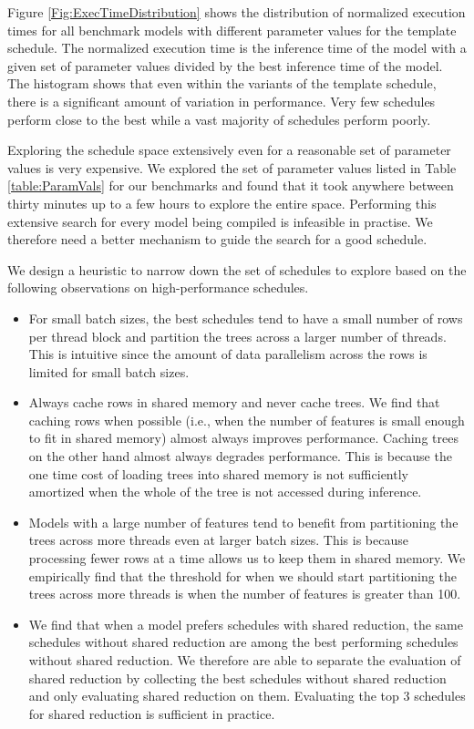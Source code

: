Figure \ref{Fig:ExecTimeDistribution} shows the distribution of normalized execution times
for all benchmark models with different parameter values for the template schedule.
The normalized execution time is the inference time of the model with a given set of
parameter values divided by the best inference time of the model.
The histogram shows that even within the variants of the template schedule, there is
a significant amount of variation in performance. Very few schedules perform close to the best
while a vast majority of schedules perform poorly.

Exploring the schedule space extensively even for a reasonable set of parameter values
is very expensive. We explored the set of parameter values listed in Table \ref{table:ParamVals}
for our benchmarks and found that it took anywhere between thirty minutes up to a few hours
to explore the entire space. Performing this extensive search for every model being compiled 
is infeasible in practise. We therefore need a better mechanism to guide the search for a good schedule.

We design a heuristic to narrow down the set of schedules to explore based on the following 
observations on high-performance schedules.
\begin{itemize}
  \item For small batch sizes, the best schedules tend to have a small number of rows
  per thread block and partition the trees across a larger number of threads. This is 
  intuitive since the amount of data parallelism across the rows is limited for small batch sizes.
  \item Always cache rows in shared memory and never cache trees. We find that caching rows 
  when possible (i.e., when the number of features is small enough to fit in shared memory)
  almost always improves performance. Caching trees on the other hand almost always degrades 
  performance. This is because the one time cost of loading trees into shared memory is 
  not sufficiently amortized when the whole of the tree is not accessed during inference. 
  \item Models with a large number of features tend to benefit from partitioning the 
  trees across more threads even at larger batch sizes. This is because processing fewer rows at a time 
  allows us to keep them in shared memory. We empirically find that the threshold for when 
  we should start partitioning the trees across more threads is when the number of features
  is greater than 100. 
  \item We find that when a model prefers schedules with shared reduction, the same schedules 
  without shared reduction are among the best performing schedules without shared reduction.
  We therefore are able to separate the evaluation of shared reduction by collecting the 
  best schedules without shared reduction and only evaluating shared reduction on them. 
  Evaluating the top 3 schedules for shared reduction is sufficient in practice.  
\end{itemize}

